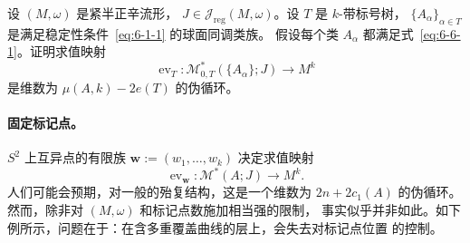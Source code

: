 \begin{exercise}\label{ex:6-6-3}
设 $(M,\omega)$ 是紧半正辛流形，
$J\in\mathcal J_{\mathrm{reg}}(M,\omega)$。设 $T$ 是 $k$-带标号树，
$\{A_\alpha\}_{\alpha\in T}$ 是满足稳定性条件~\eqref{eq:6-1-1} 的球面同调类族。
假设每个类 $A_\alpha$ 都满足式~\eqref{eq:6-6-1}。证明求值映射
\[
  \operatorname{ev}_T:
  \mathcal M^*_{0,T}(\{A_\alpha\};J)
  \longrightarrow M^k
\]
是维数为 $\mu(A,k)-2e(T)$ 的伪循环。
\end{exercise}

\paragraph{固定标记点。}
$S^2$ 上互异点的有限族
$\mathbf w:=(w_1,\ldots,w_k)$ 决定求值映射
\[
  \operatorname{ev}_{\mathbf w}:
  \mathcal M^*(A;J)\longrightarrow M^k.
\]
人们可能会预期，对一般的殆复结构，这是一个维数为
$2n+2c_1(A)$ 的伪循环。然而，除非对 $(M,\omega)$ 和标记点数施加相当强的限制，
事实似乎并非如此。如下例所示，问题在于：在含多重覆盖曲线的层上，会失去对标记点位置
的控制。

